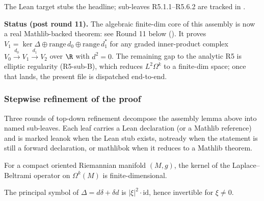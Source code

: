 \begin{lemma}
\label{lem:hodge-decomposition-overview-stepwise}
The Lean target
stubs the headline; sub-leaves R5.1.1--R5.6.2 are tracked in
.

\textbf{Status (post round 11).}  The algebraic finite-dim core of
this assembly is now a real Mathlib-backed theorem: see Round 11
below ().
It proves $V_{1} = \ker\Delta\oplus\mathrm{range}\,d_{0}\oplus\mathrm{range}\,d_{1}^{*}$
for any graded inner-product complex $V_{0}\xrightarrow{d_{0}}V_{1}\xrightarrow{d_{1}}V_{2}$
over $\R$ with $d^{2}=0$.  The remaining gap to the analytic R5 is
elliptic regularity (R5-sub-B), which reduces $L^{2}\Omega^{k}$ to a
finite-dim space; once that lands, the present file is dispatched
end-to-end.
\leanok
\end{lemma}


\subsubsection*{Stepwise refinement of the proof}

Three rounds of top-down refinement decompose the assembly
lemma above into named sub-leaves.  Each leaf carries a Lean
declaration (or a Mathlib reference) and is marked
\textsf{leanok} when the Lean stub exists, \textsf{notready}
when the statement is still a forward declaration, or
\textsf{mathlibok} when it reduces to a Mathlib theorem.

\begin{lemma}
\label{lem:hodge-laplacian-kernel-finite-dim}
For a compact oriented Riemannian manifold $(M, g)$, the kernel of the Laplace--Beltrami operator on $\Omega^{k}(M)$ is finite-dimensional.
\leanok
\end{lemma}

\begin{lemma}
\label{lem:hodge-laplacian-elliptic}
The principal symbol of $\Delta = d\delta + \delta d$ is $|\xi|^{2} \cdot \mathrm{id}$, hence invertible for $\xi \neq 0$.
\leanok
\end{lemma}

